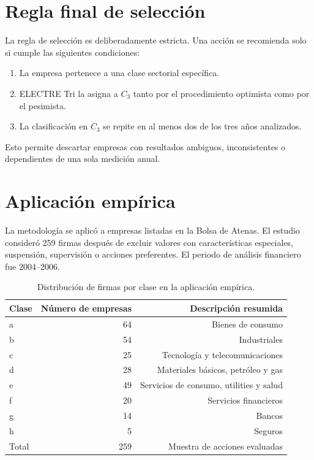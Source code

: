 \documentclass[11pt,a4paper]{article}
\begin{document}
\section{Regla final de selección}

La regla de selección es deliberadamente estricta. Una acción se recomienda solo si cumple las siguientes condiciones:

\begin{enumerate}[leftmargin=*]
    \item La empresa pertenece a una clase sectorial específica.
    \item ELECTRE Tri la asigna a $C_3$ tanto por el procedimiento optimista como por el pesimista.
    \item La clasificación en $C_3$ se repite en al menos dos de los tres años analizados.
\end{enumerate}

Esto permite descartar empresas con resultados ambiguos, inconsistentes o dependientes de una sola medición anual.

\section{Aplicación empírica}

La metodología se aplicó a empresas listadas en la Bolsa de Atenas. El estudio consideró 259 firmas después de excluir valores con características especiales, suspensión, supervisión o acciones preferentes. El periodo de análisis financiero fue 2004--2006.

\begin{table}[h!]
\centering
\caption{Distribución de firmas por clase en la aplicación empírica.}
\label{tab:distribucion}
\begin{tabular}{lrr}
\toprule
Clase & Número de empresas & Descripción resumida \\
\midrule
a & 64 & Bienes de consumo \\
b & 54 & Industriales \\
c & 25 & Tecnología y telecomunicaciones \\
d & 28 & Materiales básicos, petróleo y gas \\
e & 49 & Servicios de consumo, utilities y salud \\
f & 20 & Servicios financieros \\
g & 14 & Bancos \\
h & 5 & Seguros \\
\midrule
Total & 259 & Muestra de acciones evaluadas \\
\bottomrule
\end{tabular}
\end{table}
\end{document}
